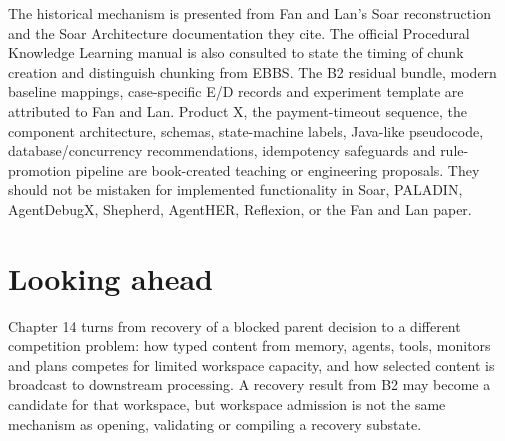 The historical mechanism is presented from Fan and Lan's Soar reconstruction and the Soar Architecture documentation they cite. The official Procedural Knowledge Learning manual is also consulted to state the timing of chunk creation and distinguish chunking from EBBS. The B2 residual bundle, modern baseline mappings, case-specific E/D records and experiment template are attributed to Fan and Lan. Product X, the payment-timeout sequence, the component architecture, schemas, state-machine labels, Java-like pseudocode, database/concurrency recommendations, idempotency safeguards and rule-promotion pipeline are book-created teaching or engineering proposals. They should not be mistaken for implemented functionality in Soar, PALADIN, AgentDebugX, Shepherd, AgentHER, Reflexion, or the Fan and Lan paper.

\autocite{soar2025architecture,soar2025procedural}

\section*{Looking ahead}
{}

Chapter 14 turns from recovery of a blocked parent decision to a different competition problem: how typed content from memory, agents, tools, monitors and plans competes for limited workspace capacity, and how selected content is broadcast to downstream processing. A recovery result from B2 may become a candidate for that workspace, but workspace admission is not the same mechanism as opening, validating or compiling a recovery substate.
